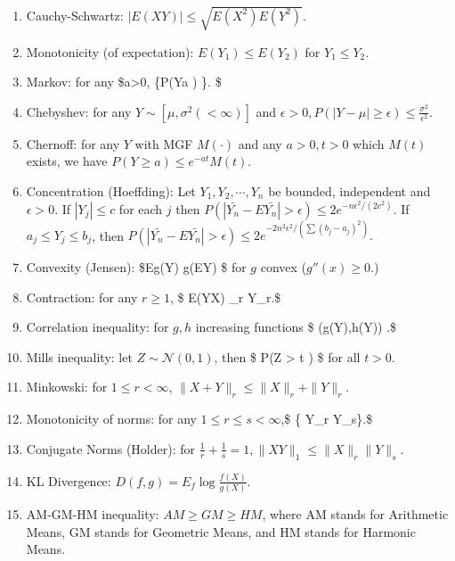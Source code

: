 \documentclass[
  letterpaper,
  DIV=11,
  numbers=noendperiod]{scrreprt}
\newcommand{\N}{\mathcal{N}}
\theoremstyle{definition}
\theoremstyle{plain}
\theoremstyle{remark}
\begin{document}
\begin{enumerate}
\def\labelenumi{\arabic{enumi}.}
\item
  Cauchy-Schwartz: \({|E(XY)| \leq \sqrt{ E(X^2)E(Y^2) }}.\)
\item
  Monotonicity (of expectation): \(E(Y_1) \leq E(Y_2)\) for
  \(Y_1\leq Y_2.\)
\item
  Markov: for any \$a\textgreater0, \{P(\textbar Y\textbar{}\geq a )
  \leq {} \}. \$
\item
  Chebyshev: for any \(Y\sim [\mu,\sigma^2 (<\infty)]\) and
  \(\epsilon>0, {P(|Y-\mu| \geq \epsilon ) \leq \frac{\sigma^2}{\epsilon^2}}.\)
\item
  Chernoff: for any \(Y\) with MGF \(M(\cdot)\) and any \(a>0,t>0\)
  which \(M(t)\) exists, we have \(P(Y\geq a ) \leq e^{-at}M(t).\)
\item
  Concentration (Hoeffding): Let \(Y_1,Y_2,\cdots,Y_n\) be bounded,
  independent and \(\epsilon>0.\) If \(|Y_j|\leq c\) for each \(j\) then
  \(P( |\bar{Y_n} - E\bar{Y_n}|>\epsilon ) \leq 2 e^{-n\epsilon^2 /(2c^2)}.\)
  If \(a_j \leq Y_j \leq b_j\), then
  \(P( |\bar{Y_n} - E\bar{Y_n}|>\epsilon ) \leq 2 e^{-2n^2\epsilon^2 /(\sum (b_j-a_j)^2)}.\)
\item
  Convexity (Jensen): \$Eg(Y) \geq g(EY) \$ for \(g\) convex
  (\(g''(x) \geq 0.\))
\item
  Contraction: for any \(r\geq 1\), \$ \textbar{}
  E(Y\textbar X)\textbar{} \_r \leq \textbar Y\textbar\_r.\$
\item
  Correlation inequality: for \(g,h\) increasing functions \$
  \cor(g(Y),h(Y)) .\$
\item
  Mills inequality: let \(Z \sim \N(0,1)\), then \$ P(Z \textgreater{} t
  ) \leq {}\$ for all \(t>0.\)
\item
  Minkowski: for \(1\leq r <\infty\),
  \(\|X+Y\|_r \leq \|X\|_r + \|Y\|_r.\)
\item
  Monotonicity of norms: for any \(1 \leq r \leq s <\infty\),\$ \{
  \textbar Y\textbar\_r \leq \textbar Y\textbar\_s\}.\$
\item
  Conjugate Norms (Holder): for
  \(\frac{1}{r} + \frac{1}{s}= 1, {\|XY\|_1 \leq \|X\|_r \|Y\|_s}.\)
\item
  KL Divergence: \(D(f,g) = E_f \log \frac{f(X)}{g(X)}.\)
\item
  AM-GM-HM inequality: \(AM \geq GM \geq HM\), where AM stands for
  Arithmetic Means, GM stands for Geometric Means, and HM stands for
  Harmonic Means.
\end{enumerate}
\end{document}
